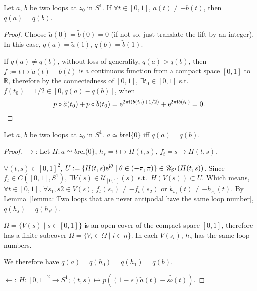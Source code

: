 \documentclass[openany, oneside, a5paper]{book}
\newcommand*{\rel}{\mathbin{\mathrm{rel}}}
\begin{document}
\begin{lemma}%
    \label{lemma: Two loops that are never antipodal have the same loop number}
    Let $a$, $b$ be two loops at $z_0$ in $S^1$.
    If $\forall t \in [0, 1]$, $a(t) \neq -b(t)$, then $q(a) = q(b)$.
\end{lemma}
\begin{proof}
    Choose $\tilde a(0) = \tilde b(0) = 0$ (if not so, just translate the lift by an integer). 
    In this case, $q(a) = \tilde a(1)$, $q(b) = \tilde b(1)$.

    If $q(a) \neq q(b)$, without loss of generality, $q(a) > q(b)$, then $f := t \mapsto \tilde a(t) - \tilde b(t)$ is a continuous function from a compact space $[0, 1]$ to $\mathbb R$, therefore by the connectedness of $[0, 1]$, $\exists t_0 \in [0, 1]$ s.t.\ $f(t_0) = 1/2 \in [0, q(a) - q(b)]$, when
    \begin{equation*}
        p \circ \tilde a(t_0) + p \circ \tilde b(t_0) = \mathrm{e}^{2\pi\mathrm{i} (\tilde b(t_0) + 1/2)} + \mathrm{e}^{2\pi\mathrm{i} \tilde b(t_0)} = 0.
    \end{equation*}
\end{proof}

\begin{lemma}%
    \label{lemma: Same loop number iff homotopic ralative to endpoint}
    Let $a$, $b$ be two loops at $z_0$ in $S^1$.
    $a \simeq b \rel \{0\}$ iff $q(a) = q(b)$.
\end{lemma}
\begin{proof}
    $\to$: Let $H \colon a \simeq b \rel \{0\}$, $h_s = t \mapsto H(t, s)$, $f_t = s \mapsto H(t, s)$.

    $\forall (t, s) \in [0, 1]^2$, $U := \{H(t, s) \mathrm{e}^{\mathrm{i} \theta} \mid \theta \in (-\pi, \pi)\} \in \mathscr U_{S^1}(H(t, s))$. 
    Since $f_t \in C([0, 1], S^1)$, $\exists V(s) \in \mathscr U_{[0, 1]}(s)$ s.t.\ $H(V(s)) \subset U$.
    Which means, $\forall t \in [0, 1]$, $\forall s_1, s2 \in V(s)$, $f_t(s_1) \neq - f_t(s_2)$ or $h_{s_1}(t) \neq - h_{s_2}(t)$. 
    By Lemma~\ref{lemma: Two loops that are never antipodal have the same loop number}, $q(h_s) = q(h_{s'})$.

    $\varOmega = \{V(s) \mid s \in [0, 1]\}$ is an open cover of the compact space $[0, 1]$, therefore has a finite subcover $\varOmega = \{V_i \in \varOmega \mid i \in n\}$. 
    In each $V(s_i)$, $h_s$ has the same loop numbers.

    We therefore have $q(a) = q(h_0) = q(h_1) = q(b)$.

    $\gets$: $H \colon [0, 1]^2 \to S^1; (t, s) \mapsto p((1 - s)\tilde a(t) - s \tilde b(t))$.
\end{proof}
\end{document}
